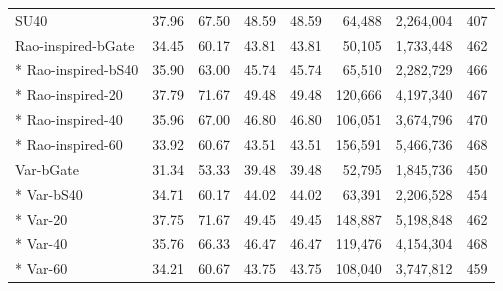\begin{small}
\begin{longtable}{lrrrrrrr}
SU40 & 37.96 & 67.50 & 48.59 & 48.59 & 64,488 & 2,264,004 & 407 \\
Rao-inspired-bGate & 34.45 & 60.17 & 43.81 & 43.81 & 50,105 & 1,733,448 & 462 \\*
Rao-inspired-bS40 & 35.90 & 63.00 & 45.74 & 45.74 & 65,510 & 2,282,729 & 466 \\*
Rao-inspired-20 & 37.79 & 71.67 & 49.48 & 49.48 & 120,666 & 4,197,340 & 467 \\*
Rao-inspired-40 & 35.96 & 67.00 & 46.80 & 46.80 & 106,051 & 3,674,796 & 470 \\*
Rao-inspired-60 & 33.92 & 60.67 & 43.51 & 43.51 & 156,591 & 5,466,736 & 468 \\
Var-bGate & 31.34 & 53.33 & 39.48 & 39.48 & 52,795 & 1,845,736 & 450 \\*
Var-bS40 & 34.71 & 60.17 & 44.02 & 44.02 & 63,391 & 2,206,528 & 454 \\*
Var-20 & 37.75 & 71.67 & 49.45 & 49.45 & 148,887 & 5,198,848 & 462 \\*
Var-40 & 35.76 & 66.33 & 46.47 & 46.47 & 119,476 & 4,154,304 & 468 \\*
Var-60 & 34.21 & 60.67 & 43.75 & 43.75 & 108,040 & 3,747,812 & 459 \\
\bottomrule\end{longtable}\end{small}

